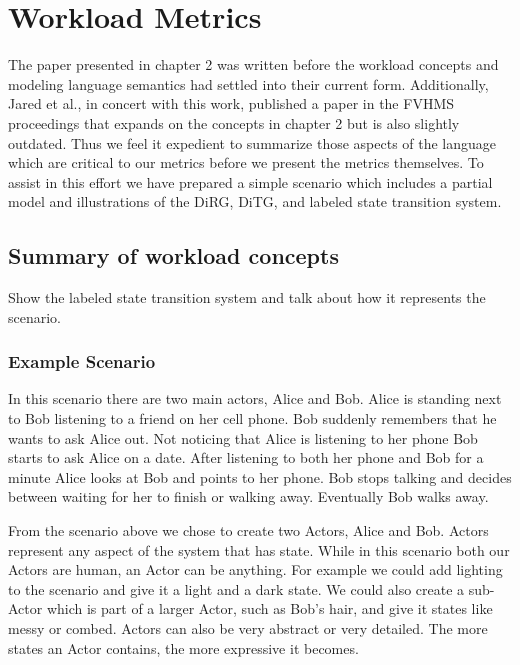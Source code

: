 \chapter{Workload Metrics} \label{ch:workload}

The paper presented in chapter 2 was written before the workload concepts and modeling language semantics had settled into their current form.  Additionally, Jared et al., in concert with this work, published a paper in the FVHMS proceedings that expands on the concepts in chapter 2 but is also slightly outdated.  Thus we feel it expedient to summarize those aspects of the language which are critical to our metrics before we present the metrics themselves.  To assist in this effort we have prepared a simple scenario which includes a partial model and illustrations of the DiRG, DiTG, and labeled state transition system.

\section{Summary of workload concepts}
Show the labeled state transition system and talk about how it represents the scenario.

\subsection{Example Scenario}

In this scenario there are two main actors, Alice and Bob.  Alice is standing next to Bob listening to a friend on her cell phone.  Bob suddenly remembers that he wants to ask Alice out.  Not noticing that Alice is listening to her phone Bob starts to ask Alice on a date.  After listening to both her phone and Bob for a minute Alice looks at Bob and points to her phone.  Bob stops talking and decides between waiting for her to finish or walking away.  Eventually Bob walks away.

From the scenario above we chose to create two Actors, Alice and Bob.  Actors represent any aspect of the system that has state.  While in this scenario both our Actors are human, an Actor can be anything.  For example we could add lighting to the scenario and give it a light and a dark state.  We could also create a sub-Actor which is part of a larger Actor, such as Bob's hair, and give it states like messy or combed.  Actors can also be very abstract or very detailed.  The more states an Actor contains, the more expressive it becomes.

